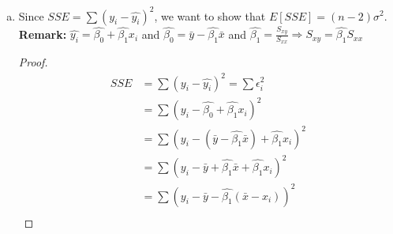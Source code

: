 \documentclass[12pt]{article}
\begin{document}
\begin{enumerate}[1.]
\begin{enumerate}[(a)]
\begin{proof}
            \[=  \beta_1 \sum \frac{(x_i - \bar{x})^2}{(x_i - \bar{x})^2}  \]
            \[E[\hat{\beta_1}] =  \beta_1 \]
            Now we can proof that $Var[\hat{\beta_1}] = \frac{\sigma^2}{S_{xx}}$ 
            \[Var[\hat{\beta_1}] = Var[\frac{\sum  (x_i - \bar{x})(y_i - \bar{y})}{\sum  (x_i - \bar{x})^2}] \]
            \[= Var[\frac{\sum  (x_i - \bar{x})(\hat{\beta_0} + \hat{\beta_1} x_i + \epsilon_i - \bar{y})}{\sum  (x_i - \bar{x})^2}] \]
            \[= Var[\frac{\sum  (x_i - \bar{x})\hat{\beta_0} + \sum  (x_i - \bar{x})\hat{\beta_1} x_i + \sum  (x_i - \bar{x})\epsilon_i - \sum  (x_i - \bar{x})\bar{y}}{\sum  (x_i - \bar{x})^2}] \]
            \[= Var[\frac{\hat{\beta_0} \sum  (x_i - \bar{x}) + \hat{\beta_1} \sum  (x_i - \bar{x}) x_i + \sum  (x_i - \bar{x})\epsilon_i - \bar{y} \sum  (x_i - \bar{x})}{\sum  (x_i - \bar{x})^2}] \]
            \[= Var[\frac{\hat{\beta_0} \cdot 0 + \hat{\beta_1} \cdot 0 + \sum  (x_i - \bar{x})\epsilon_i - \bar{y} \cdot 0}{\sum  (x_i - \bar{x})^2}] \]
            \[= Var[\frac{\sum (x_i - \bar{x}) \epsilon_i}{S_{xx}}] \]
            \[= \frac{(x_i - \bar{x})^2}{S_{xx}^2} Var[\epsilon_i]\]
            \[= \frac{S_{xx}}{S_{xx}^2} \sigma^2\]
            \[ Var[\hat{\beta_1}]= \frac{\sigma^2}{S_{xx}} \]
            \end{proof}
            $\therefore$ We can conclude that because, the $E[\hat{\beta_1}] = \beta_1$ and $Var[\hat{\beta_1}]= \frac{\sigma^2}{S_{xx}}$,
        We can safely say that $\hat{\beta_1} \sim N(\beta_1, \frac{\sigma^2}{S_{xx}})$
            \item Since $SSE = \sum (y_i - \hat{y_i})^2$, we want to show that $E[SSE] = (n - 2)\sigma^2$.
            \textbf{Remark:} $\hat{y_i} = \hat{\beta_0} + \hat{\beta_1} x_i$ and 
            $\hat{\beta_0} = \bar{y} - \hat{\beta_1} \bar{x}$ and 
            $\hat{\beta_1} = \frac{S_{xy}}{S_{xx}} \Rightarrow S_{xy} = \hat{\beta_1}S_{xx}$
            \begin{proof}
                \begin{align*}
                    SSE &= \sum (y_i - \hat{y_i})^2 = \sum \epsilon_i^2\\
                    &= \sum (y_i - \hat{\beta_0} + \hat{\beta_1} x_i)^2 \\
                    &= \sum (y_i - (\bar{y} - \hat{\beta_1} \bar{x}) + \hat{\beta_1} x_i)^2 \\
                    &= \sum (y_i - \bar{y} + \hat{\beta_1} \bar{x} + \hat{\beta_1} x_i)^2 \\
                    &= \sum (y_i - \bar{y} - \hat{\beta_1} (\bar{x} - x_i))^2 \\

\end{align*}
\end{proof}
\end{enumerate}
\end{enumerate}
\end{document}
